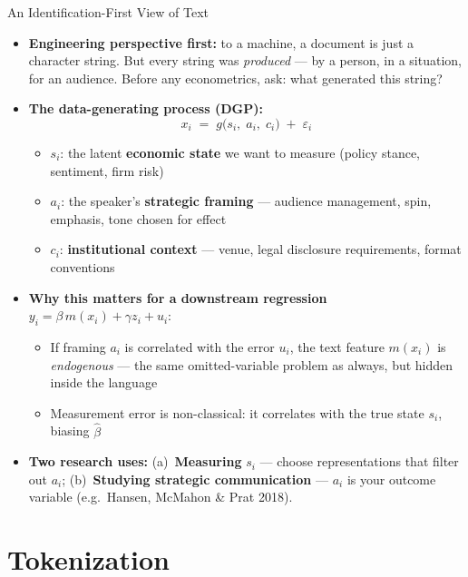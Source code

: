 \documentclass[10pt,english,aspectratio=169]{beamer}
\begin{document}
\begin{frame}{An Identification-First View of Text}
\begin{itemize}
\item \textbf{Engineering perspective first:} to a machine, a document is just a character string. But every string was \emph{produced} --- by a person, in a situation, for an audience. Before any econometrics, ask: what generated this string?

\medskip
\item \textbf{The data-generating process (DGP):}
\[
   x_i \;=\; g\bigl(s_i,\; a_i,\; c_i\bigr) \;+\; \varepsilon_i
\]
\begin{itemize}
    \item $s_i$: the latent \textbf{economic state} we want to measure (policy stance, sentiment, firm risk)
    \item $a_i$: the speaker's \textbf{strategic framing} --- audience management, spin, emphasis, tone chosen for effect
    \item $c_i$: \textbf{institutional context} --- venue, legal disclosure requirements, format conventions
\end{itemize}

\medskip
\item \textbf{Why this matters for a downstream regression} $y_i = \beta\,m(x_i) + \gamma z_i + u_i$:
\begin{itemize}
    \item If framing $a_i$ is correlated with the error $u_i$, the text feature $m(x_i)$ is \emph{endogenous} --- the same omitted-variable problem as always, but hidden inside the language
    \item Measurement error is non-classical: it correlates with the true state $s_i$, biasing $\hat\beta$
\end{itemize}

\medskip
\item \textbf{Two research uses:} (a)~\textbf{Measuring} $s_i$ --- choose representations that filter out $a_i$; (b)~\textbf{Studying strategic communication} --- $a_i$ is your outcome variable (e.g.\ Hansen, McMahon \& Prat 2018).
\end{itemize}
\end{frame}

\section{Tokenization}
\end{document}
